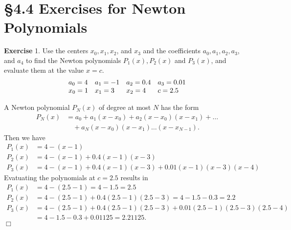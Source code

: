 \documentclass[UTF8,12pt,hyperref]{ctexart}
\makeatletter
\newenvironment{exercise}[1][{\color{blue}\bf Exercise}]%
{%
 \begin{center}   \begin{lrbox}{\@tempboxa}%
    \begin{minipage}{\textwidth}%
  {\color{blue}\bfseries
#1}   }{%
    \end{minipage}%
    \end{lrbox}
    \colorbox{green}{\noindent\usebox{\@tempboxa}} \end{center}  
}
\newenvironment{solve}[1][\color{blue}\bf Solve]{\begin{trivlist}
\item[\hskip \labelsep {\color{blue}\bfseries
#1}]}{\hfill$\Box$\end{trivlist}}
\makeatother
\begin{document}
 

 \section*{\S  4.4 Exercises for Newton Polynomials}
 
 
  
\begin{exercise}1.\qquad
Use the centers $x_0, x_1, x_2$, and $x_3$ and the coefficients $a_0, a_1, a_2, a_3$, and $a_4$ to find the Newton polynomials $P_1 (x), P_2(x)$ and $P_3(x)$, and evaluate them at the value $x = c$. 
 $$
\begin{array}{ l l l l l}
  a_0=4 & a_1=-1 & a_2=0.4 & a_3=0.01  \\
  x_0=1 & x_1=3 & x_2=4   & c=2.5   
\end{array}
$$
\end{exercise} 

\begin{solve}
  A Newton polynomial $P_N(x)$ of degree at most $N$ has the form 
  \begin{equation}
    \begin{aligned}
    P_N(x)&=a_0+a_1(x-x_0)+a_2(x-x_0)(x-x_1)+\dots\\
      &\quad +a_N(x-x_0)(x-x_1)\dots(x-x_{N-1}).
    \end{aligned}
  \end{equation}
  Then we have
  \begin{align*}
    P_1(x)&=4-(x-1)\\
    P_2(x)&=4-(x-1)+0.4(x-1)(x-3)\\
    P_3(x)&=4-(x-1)+0.4(x-1)(x-3)+0.01(x-1)(x-3)(x-4)
  \end{align*}
  Evatuating the polynomials at $c = 2.5$ results in
  \begin{align*}
    P_1(x)&=4-(2.5-1)=4-1.5=2.5\\
    P_2(x)&=4-(2.5-1)+0.4(2.5-1)(2.5-3)=4-1.5-0.3=2.2\\
    P_3(x)&=4-(2.5-1)+0.4(2.5-1)(2.5-3)+0.01(2.5-1)(2.5-3)(2.5-4)\\
          &=4-1.5-0.3+0.01125=2.21125.
  \end{align*}
\end{solve}
 
\end{document}
